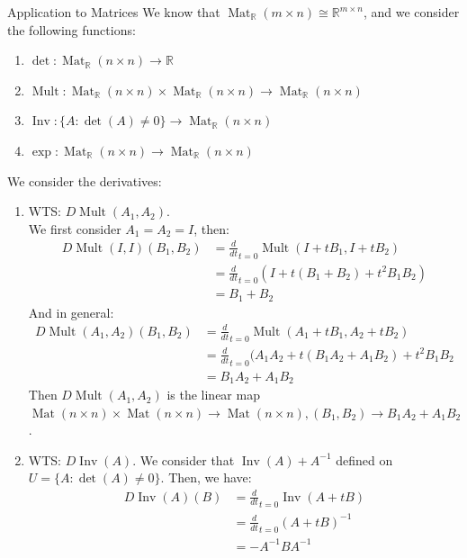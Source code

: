 \documentclass[11pt]{article}
\newenvironment{example}[1]{\begin{exbox}{#1}{}}{\end{exbox}}
\theoremstyle{quiet}
\theoremstyle{quietremark}
\begin{document}
\begin{example}{Application to Matrices}
We know that $\operatorname{Mat}_{\mathbb{R}}(m\times n)\cong\mathbb{R}^{m\times n}$, and we consider the following functions:
\begin{enumerate}
\item $\operatorname{det}:\operatorname{Mat}_\mathbb{R}(n\times n)\to\mathbb{R}$
\item $\operatorname{Mult}:\operatorname{Mat}_{\mathbb{R}}(n\times n)\times\operatorname{Mat}_{\mathbb{R}}(n\times n)\to\operatorname{Mat}_{\mathbb{R}}(n\times n)$
\item $\operatorname{Inv}:\{A:\operatorname{det}(A)\ne 0\}\to\operatorname{Mat}_{\mathbb{R}}(n\times n)$
\item $\operatorname{exp}:\operatorname{Mat}_{\mathbb{R}}(n\times n)\to\operatorname{Mat}_{\mathbb{R}}(n\times n)$
\end{enumerate}
We consider the derivatives:
\begin{enumerate}
\item WTS: $D\operatorname{Mult}(A_1,A_2)$.\\
We first consider $A_1=A_2=I$, then:
\[
\begin{aligned}
D\operatorname{Mult}(I,I)(B_1,B_2)&=
\frac{d}{dt}_{t=0}\operatorname{Mult}(I+tB_1,I+tB_2)\\
&=\frac{d}{dt}_{t=0}(I+t(B_1+B_2)+t^2B_1B_2)\\
&=B_1+B_2
\end{aligned}
\]
And in general:
\[
\begin{aligned}
D\operatorname{Mult}(A_1,A_2)(B_1,B_2)
&=\frac{d}{dt}_{t=0}\operatorname{Mult}(A_1+tB_1,A_2+tB_2)\\
&=\frac{d}{dt}_{t=0}(A_1A_2+t(B_1A_2+A_1B_2)+t^2B_1B_2\\
&=B_1A_2+A_1B_2
\end{aligned}
\]
Then $D\operatorname{Mult}(A_1,A_2)$ is the linear map $\operatorname{Mat}(n\times n)\times\operatorname{Mat}(n\times n)\to\operatorname{Mat}(n\times n), (B_1,B_2)\rightarrow B_1A_2+A_1B_2$.


\item WTS: $D\operatorname{Inv}(A)$.
We consider that $\operatorname{Inv}(A)+A^{-1}$ defined on $U=\{A:\det(A)\ne 0\}$.
Then, we have:
\[
\begin{aligned}
D\operatorname{Inv}(A)(B)&=\frac{d}{dt}_{t=0}\operatorname{Inv}(A+tB)\\&=\frac{d}{dt}_{t=0}(A+tB)^{-1}\\&=-A^{-1}BA^{-1}
\end{aligned}
\]
\end{enumerate}
\end{example}
\newpage
\end{document}
